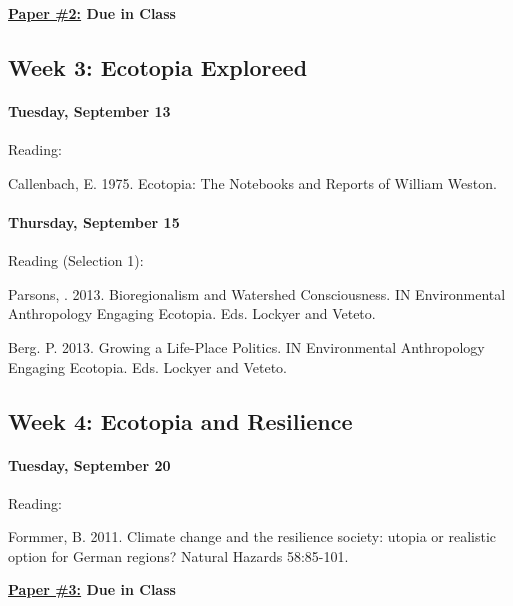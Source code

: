 \textbf{\underline{Paper \#2:} Due in Class}
      
\subsection{\textbf{Week 3}: Ecotopia Exploreed}
      
\noindent\paragraph{Tuesday, September 13} Reading:

      \begin{itemize*}
      \item Callenbach, E. 1975. Ecotopia: The Notebooks and Reports of William Weston.
      \end{itemize*}
      
\noindent\paragraph{Thursday, September 15}

\noindent Reading (Selection 1):
      \begin{itemize*}
      \item Parsons, . 2013. Bioregionalism and Watershed Consciousness. IN Environmental Anthropology Engaging Ecotopia. Eds. Lockyer and Veteto.
      \item Berg. P. 2013. Growing a Life-Place Politics. IN Environmental Anthropology Engaging Ecotopia. Eds. Lockyer and Veteto.
    \end{itemize*}
      

\subsection{\textbf{Week 4}: Ecotopia and Resilience}
    
\paragraph{Tuesday, September 20}

\noindent Reading:
    \begin{itemize*}
    \item Formmer, B. 2011. Climate change and the resilience society: utopia or realistic option for German regions? Natural Hazards 58:85-101.
    \end{itemize*}
    
\textbf{\underline{Paper \#3:} Due in Class}
    
